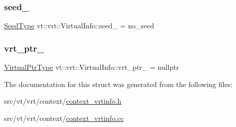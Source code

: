 \mbox{\label{structvt_1_1vrt_1_1_virtual_info_aaecc2238b249b5a4a91af1e467fc1d44}} 
\subsubsection{\texorpdfstring{seed\+\_\+}{seed\_}}
{\footnotesize\ttfamily \hyperlink{namespacevt_ae2e13198bdef4d5b8e603d6c1c7f0969}{Seed\+Type} vt\+::vrt\+::\+Virtual\+Info\+::seed\+\_\+ = no\+\_\+seed\hspace{0.3cm}{\ttfamily [private]}}

\mbox{\label{structvt_1_1vrt_1_1_virtual_info_ab8a5fcddd4869b90ec10c243efc8d1f4}} 
\subsubsection{\texorpdfstring{vrt\+\_\+ptr\+\_\+}{vrt\_ptr\_}}
{\footnotesize\ttfamily \hyperlink{structvt_1_1vrt_1_1_virtual_info_aede28e76785423dd2685fe4cf54afa21}{Virtual\+Ptr\+Type} vt\+::vrt\+::\+Virtual\+Info\+::vrt\+\_\+ptr\+\_\+ = nullptr\hspace{0.3cm}{\ttfamily [private]}}



The documentation for this struct was generated from the following files\+:\begin{DoxyCompactItemize}
\item 
src/vt/vrt/context/\hyperlink{context__vrtinfo_8h}{context\+\_\+vrtinfo.\+h}\item 
src/vt/vrt/context/\hyperlink{context__vrtinfo_8cc}{context\+\_\+vrtinfo.\+cc}\end{DoxyCompactItemize}
